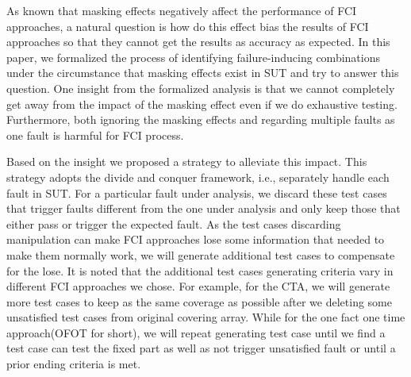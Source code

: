 \documentclass{sig-alternate}
\begin{document}
As known that masking effects negatively affect the performance of FCI approaches, a natural question is how do this effect bias the results of FCI approaches so that they cannot get the results as accuracy as expected. In this paper, we formalized the process of identifying failure-inducing combinations under the circumstance that masking effects exist in SUT and try to answer this question. One insight from the formalized analysis is that we cannot completely get away from the impact of the masking effect even if we do exhaustive testing. Furthermore, both ignoring the masking effects and regarding multiple faults as one fault is harmful for FCI process.

Based on the insight we proposed a strategy to alleviate this impact. This strategy adopts the divide and conquer framework, i.e., separately handle each fault in SUT. For a particular fault under analysis, we discard these test cases that trigger faults different from the one under analysis and only keep those that either pass or trigger the expected fault. As the test cases discarding manipulation can make FCI approaches lose some information that needed to make them normally work, we will generate additional test cases to compensate for the lose. It is noted that the additional test cases generating criteria vary in different FCI approaches we chose. For example, for the CTA, we will generate more test cases to keep as the same coverage as possible after we deleting some unsatisfied test cases from original covering array. While for the one fact one time approach(OFOT for short), we will repeat generating test case until we find a test case can test the fixed part as well as not trigger unsatisfied fault or until a prior ending criteria is met.

\end{document}
